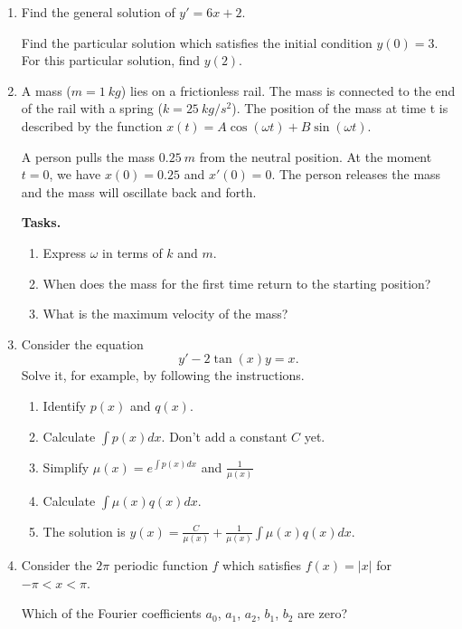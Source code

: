 \documentclass[12pt]{article}
\newcommand{\ratkaisu}[1]{{\color{blue}\quad\textrm{Solution } #1}}
\renewcommand{\ratkaisu}[1]{}
\begin{document}
\begin{enumerate}
\item Find the general solution of $y'=6x+2$.

Find the particular solution which satisfies the initial condition $y(0)=3$. For this particular solution, find $y(2)$.

\item A mass ($m=1~kg$) lies on a frictionless rail. The mass is connected to the end of the rail with a spring ($k=25~kg/s^2$). The position of the mass at time t is described by the function
$x(t)=A\cos(\omega t)+B\sin(\omega t)$.

A person pulls the mass $0.25~m$ from the neutral position. At the moment $t=0$, we have $x(0)=0.25$ and $x'(0)=0$. The person releases the mass and the mass will oscillate back and forth.

\textbf{Tasks.}
\begin{enumerate}
\item Express $\omega$ in terms of $k$ and $m$. %
\item When does the mass for the first time return to the starting position?%
\item What is the maximum velocity of the mass?%
\end{enumerate}

\item Consider the equation
$$
y'-2\tan(x)y=x.
$$
Solve it, for example, by following the instructions.
\begin{enumerate}
\item Identify $p(x)$ and $q(x)$.\ratkaisu{$p(x)=\frac{1}{x}$ and $q(x)=x^2$}
\item Calculate $\int p(x)dx$. Don't add a constant $C$ yet.\ratkaisu{$\int p(x)dx=\ln(x)$}
\item Simplify $\mu(x)=e^{\int p(x)dx}$ and $\frac{1}{\mu(x)}$\ratkaisu{$\mu(x)=x$ and $\frac{1}{\mu(x)}=\frac{1}{x}$}
\item Calculate $\int \mu(x)q(x)dx$.
\ratkaisu{$\frac{x^4}{4}$}
\item The solution is $y(x)=\frac{C}{\mu(x)}+\frac{1}{\mu(x)}\int \mu(x)q(x)dx$.
\ratkaisu{$y(x)=\frac{C}{x}+\frac{x^3}{4}$}
\end{enumerate}

\item Consider the $2\pi$ periodic function $f$ which satisfies $f(x)=|x|$ for $-\pi<x<\pi$.

Which of the Fourier coefficients $a_0$, $a_1$, $a_2$, $b_1$, $b_2$ are zero?
\end{enumerate}
\end{document}
